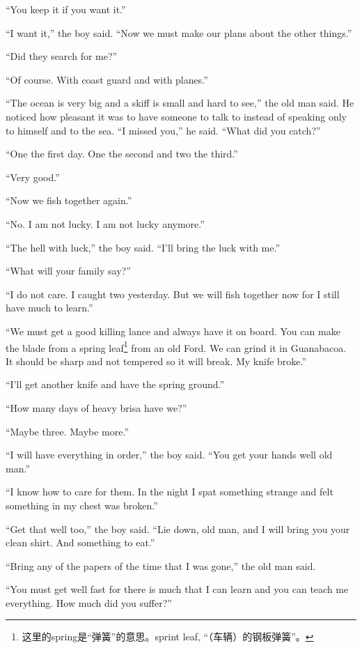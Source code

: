 \documentclass[fontset=ubuntu]{ctexrep}
\begin{document}
``You keep it if you want it.''

``I want it,'' the boy said. ``Now we must make our plans about the other things.''

``Did they search for me?''

``Of course. With coast guard and with planes.''

``The ocean is very big and a skiff is small and hard to see,'' the old man
said. He noticed how pleasant it was to have someone to talk to instead of
speaking only to himself and to the sea. ``I missed you,'' he said. ``What
did you catch?''

``One the first day. One the second and two the third.''

``Very good.''

``Now we fish together again.''

``No. I am not lucky. I am not lucky anymore.''

``The hell with luck,'' the boy said. ``I'll bring the luck with me.''

``What will your family say?''

``I do not care. I caught two yesterday. But we will fish together now for I
still have much to learn.''

``We must get a good killing \gls{lance} and always have it on board. You can make
the blade from a spring leaf\footnote{这里的spring是“弹簧”的意思。sprint
  leaf, “（车辆）的钢板弹簧”。} from an old Ford. We can \gls{grind} it
in Guanabacoa. It should be sharp and not \gls{tempered} so it will break.
My knife broke.''

``I'll get another knife and have the spring ground.''

``How many days of heavy brisa have we?''

``Maybe three. Maybe more.''

``I will have everything in order,'' the boy said. ``You get your hands well
old man.''

``I know how to care for them. In the night I spat something strange and
felt something in my chest was broken.''

``Get that well too,'' the boy said. ``Lie down, old man, and I will bring
you your clean shirt. And something to eat.''

``Bring any of the papers of the time that I was gone,'' the old man said.

``You must get well fast for there is much that I can learn and you can
teach me everything. How much did you suffer?''
\end{document}
